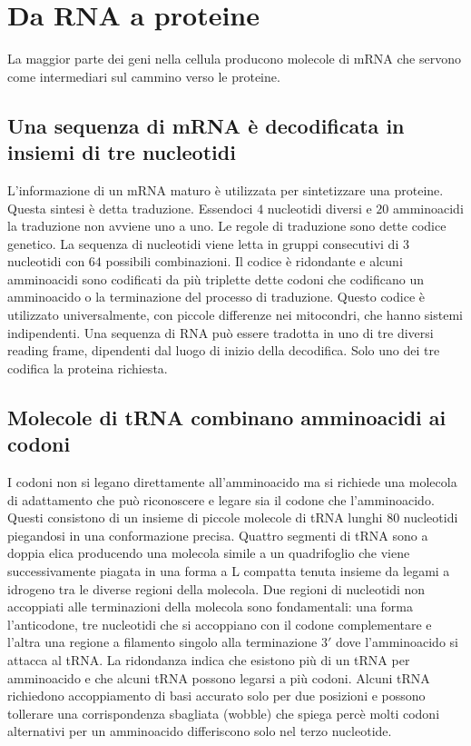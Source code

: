 \section{Da RNA a proteine}
La maggior parte dei geni nella cellula producono molecole di mRNA che servono come intermediari sul cammino verso le proteine. 
\subsection{Una sequenza di mRNA \`e decodificata in insiemi di tre nucleotidi}
L'informazione di un mRNA maturo \`e utilizzata per sintetizzare una proteine. Questa sintesi \`e detta traduzione. Essendoci $4$ nucleotidi diversi e $20$ amminoacidi la traduzione non
avviene uno a uno. Le regole di traduzione sono dette codice genetico. La sequenza di nucleotidi viene letta in gruppi consecutivi di $3$ nucleotidi con $64$ possibili combinazioni. 
Il codice \`e ridondante e alcuni amminoacidi sono codificati da pi\`u triplette dette codoni che codificano un amminoacido o la terminazione del processo di traduzione. Questo codice
\`e utilizzato universalmente, con piccole differenze nei mitocondri, che hanno sistemi indipendenti. Una sequenza di RNA pu\`o essere tradotta in uno di tre diversi reading frame, 
dipendenti dal luogo di inizio della decodifica. Solo uno dei tre codifica la proteina richiesta. 
\subsection{Molecole di tRNA combinano amminoacidi ai codoni}
I codoni non si legano direttamente all'amminoacido ma si richiede una molecola di adattamento che pu\`o riconoscere e legare sia il codone che l'amminoacido. Questi consistono di un
insieme di piccole molecole di tRNA lunghi $80$ nucleotidi piegandosi in una conformazione precisa. Quattro segmenti di tRNA sono a doppia elica producendo una molecola simile a un
quadrifoglio che viene successivamente piagata in una forma a L compatta tenuta insieme da legami a idrogeno tra le diverse regioni della molecola. Due regioni di nucleotidi non
accoppiati alle terminazioni della molecola sono fondamentali: una forma l'anticodone, tre nucleotidi che si accoppiano con il codone complementare e l'altra una regione a filamento
singolo alla terminazione $3'$ dove l'amminoacido si attacca al tRNA. La ridondanza indica che esistono pi\`u di un tRNA per amminoacido e che alcuni tRNA possono legarsi a pi\`u codoni.
Alcuni tRNA richiedono accoppiamento di basi accurato solo per due posizioni e possono tollerare una corrispondenza sbagliata (wobble) che spiega perc\`e molti codoni 
alternativi per un amminoacido differiscono solo nel terzo nucleotide. 
